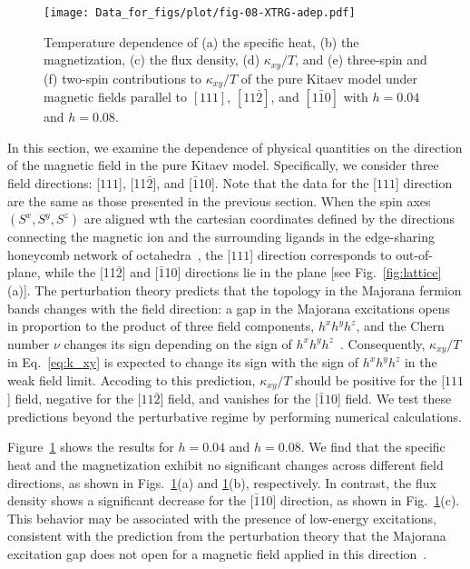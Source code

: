 \documentclass[twocolumn,superscriptaddress,showpacs, longbibliography, aps, prx]{revtex4-2}
\begin{document}
\begin{figure}[htb]
  \begin{center}
    \texttt{[image: Data\_for\_figs/plot/fig-08-XTRG-adep.pdf]}
  \end{center}  
  \caption{Temperature dependence of (a) the specific heat, (b) the magnetization, (c) the flux density, (d) $\kappa_{xy}/T$, and (e) three-spin and (f) two-spin contributions to $\kappa_{xy}/T$ of the pure Kitaev model under magnetic fields parallel to $[111]$, $[11\bar{2}]$, and $[1\bar{1}0]$ with $h=0.04$ and $h = 0.08$.
  }
  \label{fig:CMF_ab}
\end{figure}
In this section, we examine the dependence of physical quantities on the direction of the magnetic field in the pure Kitaev model.
Specifically, we consider three field directions:
[$111$], [11$\bar{2}$], and [$\bar{1}$10]. 
Note that the data for the [$111$] direction are the same as those presented in the previous section. 
When the spin axes $(S^x, S^y, S^z)$ are aligned wth the cartesian coordinates defined by the directions connecting the magnetic ion and the surrounding ligands in the edge-sharing honeycomb network of octahedra~\cite{Jackeli_PRL2009},  the [$111$] direction corresponds to out-of-plane, while the [11$\bar{2}$] and [$\bar{1}$10] directions lie in the plane [see Fig.~\ref{fig:lattice}(a)]. 
The perturbation theory predicts that the topology in the Majorana fermion bands changes with the field direction: a gap in the Majorana excitations opens in proportion to the product of three field components, $h^x h^y h^z$, and the Chern number $\nu$ changes its sign depending on the sign of $h^x h^y h^z$~\cite{Kitaev2006}. 
Consequently, $\kappa_{xy}/T$ in Eq.~\eqref{eq:k_xy} is expected to change its sign with the sign of $h^x h^y h^z$ in the weak field limit. 
Accoding to this prediction, $\kappa_{xy}/T$ should be positive for the [$111$] field, negative for the [$11\bar{2}]$ field, and vanishes for the [$\bar{1}10$] field.
We test these predictions beyond the perturbative regime by performing numerical calculations.

Figure~\ref{fig:CMF_ab} shows the results for  $h=0.04$ and $h=0.08$. 
We find that the specific heat and the magnetization exhibit no significant changes across different field directions, as shown in Figs.~\ref{fig:CMF_ab}(a) and \ref{fig:CMF_ab}(b), respectively. 
In contrast, the flux density shows a significant decrease for the [$\bar{1}$10] direction, as shown in Fig.~\ref{fig:CMF_ab}(c). 
This behavior may be associated with the presence of low-energy excitations, consistent with the prediction from the perturbation theory that the Majorana excitation gap does not open for a magnetic field applied in this direction~\cite{Kitaev2006}.
\end{document}
